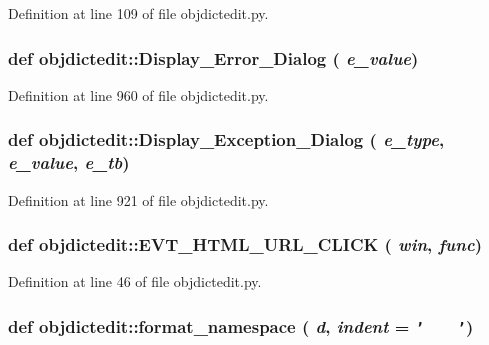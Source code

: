 Definition at line 109 of file objdictedit.py.\hypertarget{namespaceobjdictedit_e994527ec0f61cfe371dfa80d802d4cb}{
\subsubsection[Display\_\-Error\_\-Dialog]{\setlength{\rightskip}{0pt plus 5cm}def objdictedit::Display\_\-Error\_\-Dialog ( {\em e\_\-value})}}
\label{namespaceobjdictedit_e994527ec0f61cfe371dfa80d802d4cb}




Definition at line 960 of file objdictedit.py.\hypertarget{namespaceobjdictedit_2c93a930b5594c97af560c8b245651ad}{
\subsubsection[Display\_\-Exception\_\-Dialog]{\setlength{\rightskip}{0pt plus 5cm}def objdictedit::Display\_\-Exception\_\-Dialog ( {\em e\_\-type},  {\em e\_\-value},  {\em e\_\-tb})}}
\label{namespaceobjdictedit_2c93a930b5594c97af560c8b245651ad}




Definition at line 921 of file objdictedit.py.\hypertarget{namespaceobjdictedit_6f56af22e4041461f4f3852041fd46cf}{
\subsubsection[EVT\_\-HTML\_\-URL\_\-CLICK]{\setlength{\rightskip}{0pt plus 5cm}def objdictedit::EVT\_\-HTML\_\-URL\_\-CLICK ( {\em win},  {\em func})}}
\label{namespaceobjdictedit_6f56af22e4041461f4f3852041fd46cf}




Definition at line 46 of file objdictedit.py.\hypertarget{namespaceobjdictedit_929d463a75220fa2964868f9495a944e}{
\subsubsection[format\_\-namespace]{\setlength{\rightskip}{0pt plus 5cm}def objdictedit::format\_\-namespace ( {\em d},  {\em indent} = {\tt '~~~~'})}}
\label{namespaceobjdictedit_929d463a75220fa2964868f9495a944e}




